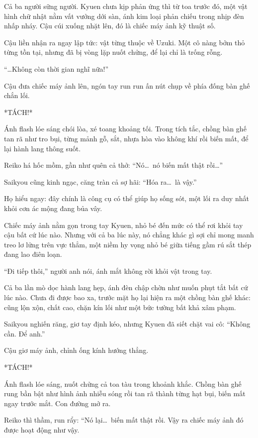 \documentclass[../main.tex]{subfiles}
\begin{document}
Cả ba người sững người. Kyuen chưa kịp phản ứng thì từ toa trước đó, một vật hình chữ nhật nằm vất vưởng dới sàn, ánh kim loại phản chiếu trong nhịp đèn nhấp nháy. Cậu cúi xuống nhặt lên, đó là chiếc máy ảnh kỹ thuật số.

Cậu liền nhận ra ngay lập tức: vật từng thuộc về Uzuki. Một cô nàng bởm thỏ từng tồn tại, nhưng đã bị vòng lặp nuốt chửng, để lại chỉ là trống rỗng.

``\dots Không còn thời gian nghĩ nữa!''

Cậu đưa chiếc máy ảnh lên, ngón tay run run ấn nút chụp về phía đống bàn ghế chắn lối.

*TÁCH!*

Ánh flash lóe sáng chói lòa, xé toang khoảng tối. Trong tích tắc, chồng bàn ghế tan rã như tro bụi, từng mảnh gỗ, sắt, nhựa hòa vào không khí rồi biến mất, để lại hành lang thông suốt.

Reiko há hốc mồm, gần như quên cả thở: ``Nó\dots\ nó biến mất thật rồi\dots''

Saikyou cũng kinh ngạc, căng tràn cả sợ hãi: ``Hóa ra\dots\ là vậy.''

Họ hiểu ngay: đây chính là công cụ có thể giúp họ sống sót, một lối ra duy nhất khỏi cơn ác mộng đang bủa vây.

Chiếc máy ảnh nằm gọn trong tay Kyuen, nhỏ bé đến mức có thể rơi khỏi tay cậu bất cứ lúc nào. Nhưng với cả ba lúc này, nó chẳng khác gì sợi chỉ mong manh treo lơ lửng trên vực thẳm, một niềm hy vọng nhỏ bé giữa tiếng gầm rú sắt thép đang lao điên loạn.

``Đi tiếp thôi,'' người anh nói, ánh mắt không rời khỏi vật trong tay.

Cả ba lần mò dọc hành lang hẹp, ánh đèn chập chờn như muốn phụt tắt bất cứ lúc nào. Chưa đi được bao xa, trước mặt họ lại hiện ra một chồng bàn ghế khác: cũng lộn xộn, chất cao, chặn kín lối như một bức tường bất khả xâm phạm.

Saikyou nghiến răng, giơ tay định kéo, nhưng Kyuen đã siết chặt vai cô: ``Không cần. Để anh.''

Cậu giơ máy ảnh, chỉnh ống kính hướng thẳng.

*TÁCH!*

Ánh flash lóe sáng, nuốt chửng cả toa tàu trong khoảnh khắc. Chồng bàn ghế rung bần bật như hình ảnh nhiễu sóng rồi tan rã thành từng hạt bụi, biến mất ngay trước mắt. Con đường mở ra.

Reiko thì thầm, run rẩy: ``Nó lại\dots\ biến mất thật rồi. Vậy ra chiếc máy ảnh đó được hoạt động như vậy.
\end{document}
